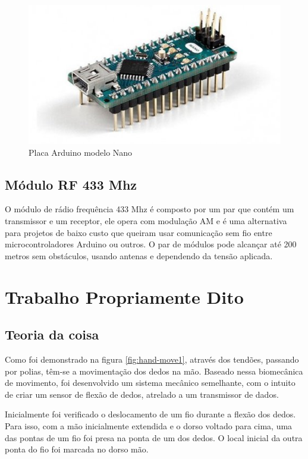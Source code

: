\documentclass{ufpatcc}
\begin{document}
		\begin{figure}[h!]
  		\label{fig:arduino-nano1}
			\centering
  		\includegraphics[scale=0.7]{../pictures/arduino-nano1.jpg}
			\caption{Placa Arduino modelo Nano \cite{arduinonanosite}}
		\end{figure}

		\section{Módulo RF 433 Mhz}
		O módulo de rádio frequência 433 Mhz é composto por um par que contém um transmissor e um receptor, ele opera com modulação AM e é uma alternativa para projetos de baixo custo que queiram usar comunicação sem fio entre microcontroladores Arduino ou outros. O par de módulos pode alcançar até 200 metros sem obstáculos, usando antenas e dependendo da tensão aplicada.\cite{institutodigitalrf}
		
		



	\chapter{Trabalho Propriamente Dito}

		\section{Teoria da coisa}
			Como foi demonstrado na figura \ref{fig:hand-move1}, através dos tendões, passando por polias, têm-se a movimentação dos dedos na mão. Baseado nessa biomecânica de movimento, foi desenvolvido um sistema mecânico semelhante, com o intuito de criar um sensor de flexão de dedos, atrelado a um transmissor de dados.
			
			Inicialmente foi verificado o deslocamento de um fio durante a flexão dos dedos. Para isso, com a mão inicialmente extendida e o dorso voltado para cima, uma das pontas de um fio foi presa na ponta de um dos dedos. O local inicial da outra ponta do fio foi marcada no dorso mão.
\end{document}
